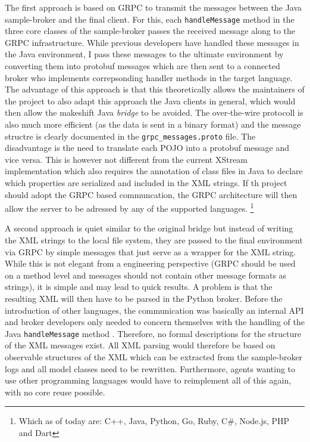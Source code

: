 The first approach is based on \ac{GRPC} to transmit the messages between the Java sample-broker and the final client. For this, each \texttt{handleMessage} method in the three core classes of the sample-broker passes the received message along to the \ac {GRPC} infrastructure. While previous developers have handled these messages in the Java environment, I pass these messages to the ultimate environment by converting them into protobuf messages which are then sent to a connected broker who implements correpsonding handler methods in the target language. The advantage of this approach is that this theoretically allows the maintainers of the project to also adapt this approach the Java clients in general, which would then allow the makeshift Java \emph{bridge} to be avoided. The over-the-wire protocoll is also much more efficient (as the data is sent in a binary format) and the message structre is clearly documented in the \texttt{grpc\_messages.proto} file. The disadvantage is the need to translate each \ac{POJO} into a protobuf message and vice versa. This is however not different from the current XStream implementation which also requires the annotation of class files in Java to declare which properties are serialized and included in the \ac {XML} strings. If th project should adopt the \ac {GRPC} based communcation, the \ac {GRPC} architecture will then allow the server to be adressed by any of the supported languages.
\footnote{Which as of today are: C++, Java, Python, Go, Ruby, C\#, Node.js, PHP and Dart}

A second approach is quiet similar to the original bridge but instead of writing the \ac {XML} strings to the local file system, they are passed to the final environment via \ac {GRPC} by simple messages that just serve as a wrapper for the \ac {XML} string. While this is not elegant from a engineering perspective (\ac {GRPC} should be used on a method level and messages should not contain other message formats as strings), it is simple and may lead to quick results. A problem is that the resulting \ac {XML} will then have to be parsed in the Python broker. Before the introduction of other languages, the communication was basically an internal API and broker developers only needed to concern themselves with the handling of the Java \texttt{handleMessage} method . Therefore, no formal descriptions for the structure of the \ac {XML} messages exist. All \ac {XML} parsing would therefore be based on observable structures of the \ac {XML} which can be extracted from the sample-broker logs and all model classes need to be rewritten. Furthermore, agents wanting to use other programming languages would have to reimplement all of this again, with no core reuse possible.

